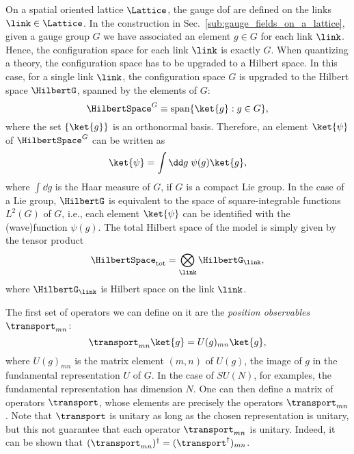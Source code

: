 On a spatial oriented lattice $\Lattice$, the gauge \ac{dof} are defined on the links $\link \in \Lattice$.
In the construction in Sec.~\ref{sub:gauge_fields_on_a_lattice}, given a gauge group $G$ we have associated an element $g \in G$ for each link $\link$.
Hence, the configuration space for each link $\link$ is exactly $G$.
When quantizing a theory, the configuration space has to be upgraded to a Hilbert space.
In this case, for a single link $\link$, the configuration space $G$ is upgraded to the Hilbert space $\HilbertG$, spanned by the elements of $G$:
\begin{equation}
    \HilbertSpace^G \equiv \text{span}\{\ket{g} : g \in G\},
    \label{eq:single_link_Hilbert_space}
\end{equation}
where the set $\{\ket{g}\}$ is an orthonormal basis.
Therefore, an element $\ket{\psi}$ of $\HilbertSpace^G$ can be written as
\begin{equation}
    \ket{\psi} = \int \dd g \; \psi(g) \ket{g},
\end{equation}
where $\int \dd g$ is the Haar measure of $G$, if $G$ is a compact Lie group.
In the case of a Lie group, $\HilbertG$ is equivalent to the space of square-integrable functions $L^2(G)$ of $G$, i.e., each element $\ket{\psi}$ can be identified with the (wave)function $\psi(g)$.
The total Hilbert space of the model is simply given by the tensor product
\begin{equation}
    \HilbertSpace_{\text{tot}} = \bigotimes_{\link} \HilbertG_{\link},
    \label{eq:total_Hilbert_space}
\end{equation}
where $\HilbertG_{\link}$ is Hilbert space on the link $\link$.

\medskip

The first set of operators we can define on it are the \emph{position observables} $\transport_{mn}$:
\begin{equation}
    \transport_{mn} \ket{g} = U(g)_{mn} \ket{g},
\end{equation}
where $U(g)_{mn}$ is the matrix element $(m, n)$ of $U(g)$, the image of $g$ in the fundamental representation $U$ of $G$.
In the case of $SU(N)$, for examples, the fundamental representation has dimension $N$.
One can then define a matrix of operators $\transport$, whose elements are precisely the operators $\transport_{mn}$.
Note that $\transport$ is unitary as long as the chosen representation is unitary, but this not guarantee that each operator $\transport_{mn}$ is unitary.
Indeed, it can be shown that $(\transport_{mn})^{\dagger} = (\transport^{\dagger})_{mn}$.


